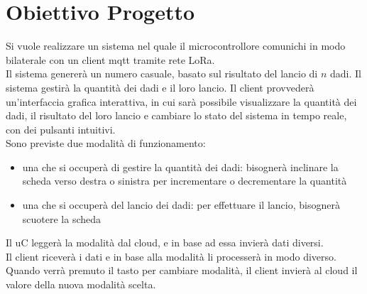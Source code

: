 \section{Obiettivo Progetto}
Si vuole realizzare un sistema nel quale il microcontrollore comunichi in modo bilaterale con un client mqtt tramite rete LoRa.
\\Il sistema genererà un numero casuale, basato sul risultato del lancio di $n$ dadi. Il sistema gestirà la quantità dei dadi e il loro lancio. Il client provvederà un'interfaccia grafica interattiva, in cui sarà possibile visualizzare la quantità dei dadi, il risultato del loro lancio
e cambiare lo stato del sistema in tempo reale, con dei pulsanti intuitivi.
\\Sono previste due modalità di funzionamento:
\begin{itemize}
  \item una che si occuperà di gestire la quantità dei dadi: bisognerà inclinare la scheda verso destra o sinistra per incrementare o decrementare la quantità
  \item una che si occuperà del lancio dei dadi: per effettuare il lancio, bisognerà scuotere la scheda
\end{itemize}
Il uC leggerà la modalità dal cloud, e in base ad essa invierà dati diversi.
\\Il client riceverà i dati e in base alla modalità li processerà in modo diverso. Quando verrà premuto il tasto per cambiare modalità, il client invierà al cloud il valore della nuova modalità scelta.





